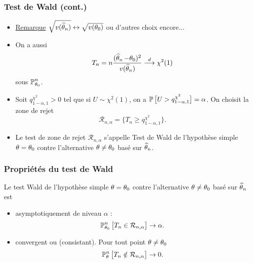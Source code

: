\begin{frame}
\frametitle{Test de Wald (cont.)}
\begin{itemize}
\item \underline{Remarque} $\sqrt{v(\operatorname{\widehat \theta_{\mathnormal{n}}})} \leftrightarrow \sqrt{v(\theta_0)}$ ou d'autres choix encore...
\item On a aussi
$$T_n = n\frac{(\operatorname{\widehat \theta_{\mathnormal{n}}}-\theta_0)^2}{v(\operatorname{\widehat \theta_{\mathnormal{n}}})} \stackrel{d}{\longrightarrow} \chi^2(1)$$
sous $\operatorname{{\mathbb P}}_{\theta_0}^n$.
\item Soit $q_{1-\alpha,1}^{\chi^2} >0$ tel que si $U \sim \chi^2(1)$, on a $\operatorname{{\mathbb P}}\big[U > q_{1-\alpha,1}^{\chi^2}\big]=\alpha$. On \alert{choisit la zone de rejet}
$${\mathcal R}_{n,\alpha} = \big\{T_n\geq q_{1-\alpha,1}^{\chi^2}\big\}.$$
\item Le test de zone de rejet ${\mathcal R}_{n,\alpha}$ s'appelle \alert{Test de Wald de l'hypothèse simple $\theta=\theta_0$ contre l'alternative $\theta \neq \theta_0$ basé sur $\operatorname{\widehat \theta_{\mathnormal{n}}}$.}
\end{itemize}
\end{frame}

\begin{frame}
\frametitle{Propriétés du test de Wald}
\begin{prop}
Le test Wald de l'hypothèse simple $\theta=\theta_0$ contre l'alternative $\theta \neq \theta_0$ basé sur $\operatorname{\widehat \theta_{\mathnormal{n}}}$ est
\begin{itemize}
\item \alert{asymptotiquement} de niveau $\alpha$ :
$$\operatorname{{\mathbb P}}_{\theta_0}^n\big[T_n \in {\mathcal R}_{n,\alpha}\big]\rightarrow \alpha.$$
\item \alert{convergent ou (consistant)}. Pour tout point $\theta \neq \theta_0$
$$\operatorname{{\mathbb P}}_\theta^n\big[T_n \notin {\mathcal R}_{n,\alpha}\big] \rightarrow 0.$$
\end{itemize}
\end{prop}
\end{frame}

